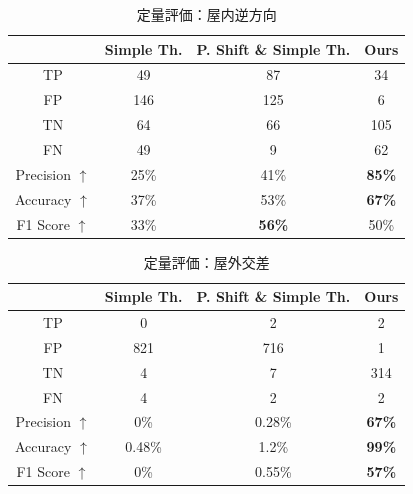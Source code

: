 \documentclass[conference]{IEEEtran}
\begin{document}
\begin{table}[t]
  \centering
  \small
  \caption{定量評価：屋内逆方向}
  \label{table:ld_eval_indoor_reverse}%
  \begin{tabular}{cccc}
  \toprule%
  & \textbf{Simple Th.} & \textbf{P. Shift \& Simple Th.} & \textbf{Ours}\\
  \midrule%
  TP & 49 & 87 & 34\\
  FP & 146 & 125 & 6\\
  TN & 64 & 66 & 105\\
  FN & 49 & 9 &  62\\
  Precision \textbf{$\uparrow$} & 25\% & 41\% & \textbf{85\%}\\
  Accuracy \textbf{$\uparrow$} & 37\% & 53\% & \textbf{67\%}\\
  F1 Score \textbf{$\uparrow$} & 33\% & \textbf{56\%} & 50\%\\
  \bottomrule%
  \end{tabular}
\end{table}


\begin{table}[t]
  \centering
  \small
  \caption{定量評価：屋外交差}
  \label{table:ld_eval_outdoor_cross}%
  \begin{tabular}{cccc}
  \toprule%
  & \textbf{Simple Th.} & \textbf{P. Shift \& Simple Th.} & \textbf{Ours}\\
  \midrule%
  TP & 0 & 2 & 2\\
  FP & 821 & 716 & 1\\
  TN & 4 & 7 & 314\\
  FN & 4 & 2 & 2\\
  Precision \textbf{$\uparrow$} & 0\% & 0.28\% & \textbf{67\%}\\
  Accuracy \textbf{$\uparrow$} & 0.48\% & 1.2\% & \textbf{99\%}\\
  F1 Score \textbf{$\uparrow$} & 0\% & 0.55\% & \textbf{57\%}\\
  \bottomrule%
  \end{tabular}
\end{table}
\end{document}
